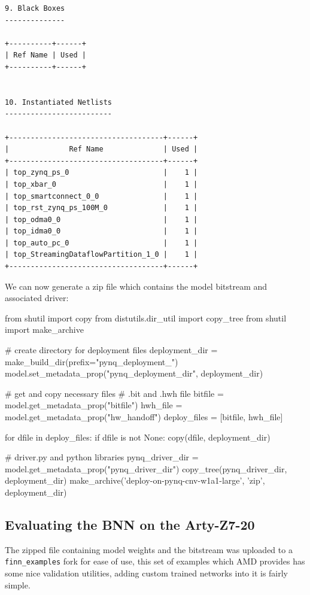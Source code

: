\documentclass[11pt]{article}
\begin{document}
{\begin{verbatim}
9. Black Boxes
--------------

+----------+------+
| Ref Name | Used |
+----------+------+


10. Instantiated Netlists
-------------------------

+------------------------------------+------+
|              Ref Name              | Used |
+------------------------------------+------+
| top_zynq_ps_0                      |    1 |
| top_xbar_0                         |    1 |
| top_smartconnect_0_0               |    1 |
| top_rst_zynq_ps_100M_0             |    1 |
| top_odma0_0                        |    1 |
| top_idma0_0                        |    1 |
| top_auto_pc_0                      |    1 |
| top_StreamingDataflowPartition_1_0 |    1 |
+------------------------------------+------+
\end{verbatim}
}

We can now generate a zip file which contains the model bitstream and associated driver:

\begin{jupytercell}
from shutil import copy
from distutils.dir_util import copy_tree
from shutil import make_archive

# create directory for deployment files
deployment_dir = make_build_dir(prefix="pynq_deployment_")
model.set_metadata_prop("pynq_deployment_dir", deployment_dir)

# get and copy necessary files
# .bit and .hwh file
bitfile = model.get_metadata_prop("bitfile")
hwh_file = model.get_metadata_prop("hw_handoff")
deploy_files = [bitfile, hwh_file]

for dfile in deploy_files:
    if dfile is not None:
        copy(dfile, deployment_dir)

# driver.py and python libraries
pynq_driver_dir = model.get_metadata_prop("pynq_driver_dir")
copy_tree(pynq_driver_dir, deployment_dir)
make_archive('deploy-on-pynq-cnv-w1a1-large', 'zip', deployment_dir)
\end{jupytercell}
\subsection{Evaluating the BNN on the Arty-Z7-20}
The zipped file containing model weights and the bitstream was uploaded to a \verb+finn_examples+ fork for ease of use, 
this set of examples which AMD provides has some nice validation utilities, adding custom trained networks into it is fairly simple.
\end{document}
